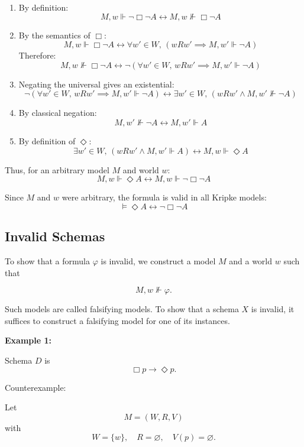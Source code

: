 \documentclass[12pt,a4paper,openany]{article}
\begin{document}
\begin{enumerate}
    \item By definition:
    $$M, w \Vdash \neg \Box \neg A \leftrightarrow M, w \nVdash \Box \neg A$$
    
    \item By the semantics of $\Box$:
    $$M, w \Vdash \Box \neg A \leftrightarrow \forall w' \in W,\, (w R w' \implies M, w' \Vdash \neg A)$$
    Therefore:
    $$M, w \nVdash \Box \neg A \leftrightarrow \neg (\forall w' \in W,\, w R w' \implies M, w' \Vdash \neg A)$$
    
    \item Negating the universal gives an existential:
    $$\neg (\forall w' \in W,\, w R w' \implies M, w' \Vdash \neg A) \leftrightarrow \exists w' \in W,\, (w R w' \wedge M, w' \nVdash \neg A)$$
    
    \item By classical negation:
    $$M, w' \nVdash \neg A \leftrightarrow M, w' \Vdash A$$
    
    \item By definition of $\Diamond$:
    $$\exists w' \in W,\, (w R w' \wedge M, w' \Vdash A) \leftrightarrow M, w \Vdash \Diamond A$$
\end{enumerate}

Thus, for an arbitrary model $M$ and world $w$:
$$M, w \Vdash \Diamond A \leftrightarrow M, w \Vdash \neg \Box \neg A$$

Since $M$ and $w$ were arbitrary, the formula is valid in all Kripke models:
$$\models \Diamond A \leftrightarrow \neg \Box \neg A$$

\subsection{Invalid Schemas}

To show that a formula $\varphi$ is invalid, we construct a model $M$ and a world $w$ such that

$$M, w \not\Vdash \varphi.$$

Such models are called falsifying models. To show that a schema $X$ is invalid, it suffices to construct a falsifying model for one of its instances.

\textbf{Example 1:}

Schema $D$ is
$$\Box p \to \Diamond p.$$

Counterexample:

Let
$$M=(W,R,V)$$
with
$$W=\{w\},\quad R=\varnothing,\quad V(p)=\varnothing.$$
\end{document}
